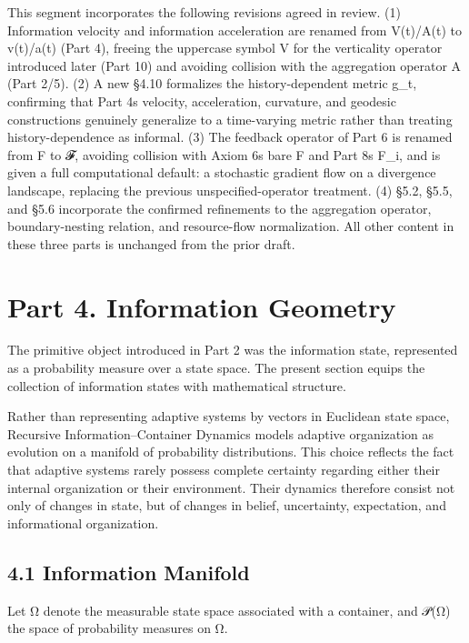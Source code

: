 \documentclass[
]{article}
\begin{document}
This segment incorporates the following revisions agreed in review. (1)
Information velocity and information acceleration are renamed from
V(t)/A(t) to v(t)/a(t) (Part 4), freeing the uppercase symbol V for the
verticality operator introduced later (Part 10) and avoiding collision
with the aggregation operator A (Part 2/5). (2) A new §4.10 formalizes
the history-dependent metric g\_t, confirming that Part 4s velocity,
acceleration, curvature, and geodesic constructions genuinely generalize
to a time-varying metric rather than treating history-dependence as
informal. (3) The feedback operator of Part 6 is renamed from F to 𝓕,
avoiding collision with Axiom 6s bare F and Part 8s F\_i, and is given a
full computational default: a stochastic gradient flow on a divergence
landscape, replacing the previous unspecified-operator treatment. (4)
§5.2, §5.5, and §5.6 incorporate the confirmed refinements to the
aggregation operator, boundary-nesting relation, and resource-flow
normalization. All other content in these three parts is unchanged from
the prior draft.

\hypertarget{part-4.-information-geometry}{%
\section{Part 4. Information
Geometry}\label{part-4.-information-geometry}}

The primitive object introduced in Part 2 was the information state,
represented as a probability measure over a state space. The present
section equips the collection of information states with mathematical
structure.

Rather than representing adaptive systems by vectors in Euclidean state
space, Recursive Information--Container Dynamics models adaptive
organization as evolution on a manifold of probability distributions.
This choice reflects the fact that adaptive systems rarely possess
complete certainty regarding either their internal organization or their
environment. Their dynamics therefore consist not only of changes in
state, but of changes in belief, uncertainty, expectation, and
informational organization.

\hypertarget{information-manifold}{%
\subsection{4.1 Information Manifold}\label{information-manifold}}

Let Ω denote the measurable state space associated with a container, and
𝒫(Ω) the space of probability measures on Ω.
\end{document}
